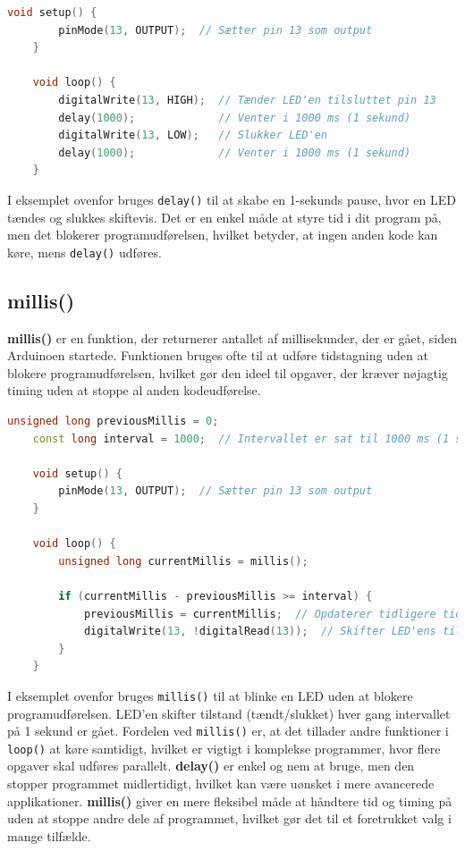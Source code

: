 \begin{lstlisting}[language=C++, caption=Eksempel på brug af delay]
	void setup() {
		pinMode(13, OUTPUT);  // Sætter pin 13 som output
	}
	
	void loop() {
		digitalWrite(13, HIGH);  // Tænder LED'en tilsluttet pin 13
		delay(1000);             // Venter i 1000 ms (1 sekund)
		digitalWrite(13, LOW);   // Slukker LED'en
		delay(1000);             // Venter i 1000 ms (1 sekund)
	}
\end{lstlisting}
I eksemplet ovenfor bruges \texttt{delay()} til at skabe en 1-sekunds pause, hvor en LED tændes og slukkes skiftevis. Det er en enkel måde at styre tid i dit program på, men det blokerer programudførelsen, hvilket betyder, at ingen anden kode kan køre, mens \texttt{delay()} udføres.

\subsection{millis()}
\textbf{millis()} er en funktion, der returnerer antallet af millisekunder, der er gået, siden Arduinoen startede. Funktionen bruges ofte til at udføre tidstagning uden at blokere programudførelsen, hvilket gør den ideel til opgaver, der kræver nøjagtig timing uden at stoppe al anden kodeudførelse.
\begin{lstlisting}[language=C++, caption=Eksempel på brug af millis]
	unsigned long previousMillis = 0;
	const long interval = 1000;  // Intervallet er sat til 1000 ms (1 sekund)
	
	void setup() {
		pinMode(13, OUTPUT);  // Sætter pin 13 som output
	}
	
	void loop() {
		unsigned long currentMillis = millis();
		
		if (currentMillis - previousMillis >= interval) {
			previousMillis = currentMillis;  // Opdaterer tidligere tid
			digitalWrite(13, !digitalRead(13));  // Skifter LED'ens tilstand
		}
	}
\end{lstlisting}
I eksemplet ovenfor bruges \texttt{millis()} til at blinke en LED uden at blokere programudførelsen. LED'en skifter tilstand (tændt/slukket) hver gang intervallet på 1 sekund er gået. Fordelen ved \texttt{millis()} er, at det tillader andre funktioner i \texttt{loop()} at køre samtidigt, hvilket er vigtigt i komplekse programmer, hvor flere opgaver skal udføres parallelt.
\newline\newline\noindent
\textbf{delay()} er enkel og nem at bruge, men den stopper programmet midlertidigt, hvilket kan være uønsket i mere avancerede applikationer. \textbf{millis()} giver en mere fleksibel måde at håndtere tid og timing på uden at stoppe andre dele af programmet, hvilket gør det til et foretrukket valg i mange tilfælde.


